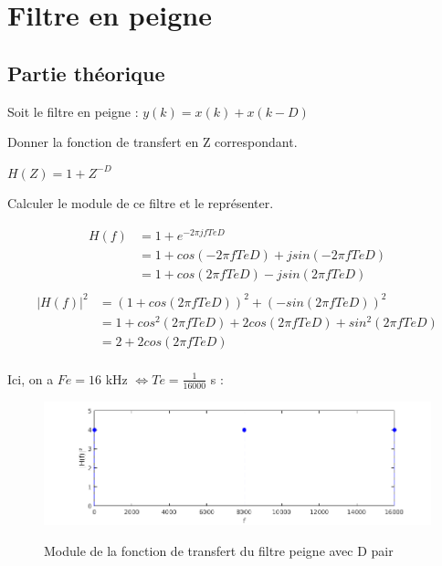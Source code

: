 
\section{Filtre en peigne}

\subsection{Partie théorique}

Soit le filtre en peigne : $y(k)= x(k)+ x(k − D)$

Donner la fonction de transfert en Z correspondant.

$H(Z) = 1 + Z^{-D}$

Calculer le module de ce filtre et le représenter.

\begin{align*}
  H(f) &= 1 + e^{-2\pi jfTeD}\\
       &= 1 + cos(-2\pi fTeD) + jsin(-2\pi fTeD)\\
       &= 1 + cos(2\pi fTeD) - jsin(2\pi fTeD)\\
\end{align*}
\begin{align*}
  |H(f)|^{2} &= (1 + cos(2\pi fTeD))^{2} + (-sin(2\pi fTeD))^{2}\\
             &= 1 + cos^{2}(2\pi fTeD) + 2cos(2\pi fTeD) + sin^{2}(2\pi fTeD)\\
             &= 2 + 2cos(2\pi fTeD)\\
\end{align*}


Ici, on a $Fe = 16$ kHz $\iff Te = \frac{1}{16000}$ s :

\begin{figure}[!ht]
		\begin{center}
			\includegraphics[width=1\textwidth]{img/modulePeigneDpair}
			\label{fig:modulePeigneDpair}
			\caption{Module de la fonction de transfert du filtre peigne avec D pair}
		\end{center}
\end{figure}

